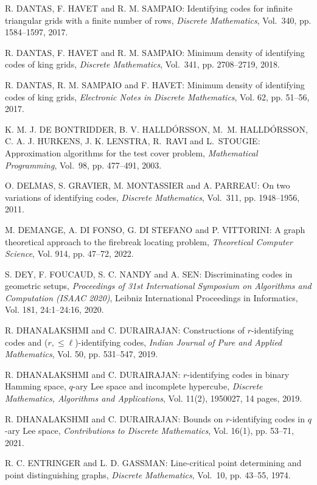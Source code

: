\begin{thebibliography}{999}
R. DANTAS, F. HAVET and R. M. SAMPAIO: Identifying codes for infinite triangular grids with a finite number of rows, {\it Discrete Mathematics}, Vol.~340, pp. 1584--1597, 2017.

R. DANTAS, F. HAVET and R. M. SAMPAIO: Minimum density of identifying codes of king grids, {\it Discrete Mathematics}, Vol.~341, pp. 2708--2719, 2018. 

R. DANTAS, R. M. SAMPAIO and F. HAVET: Minimum density of identifying codes of king grids, {\it Electronic Notes in Discrete Mathematics}, Vol. 62, pp. 51--56, 2017. 

K. M. J. DE BONTRIDDER, B. V. HALLD\'ORSSON, M.~M. HALL\-D\'ORS\-SON, C. A. J. HURKENS, J. K. LENSTRA, R.~RAVI and L.~STOU\-GIE: Approximation algorithms for the test cover problem, {\it Mathematical Programming}, Vol.~98, pp. 477--491, 2003.

O. DELMAS, S. GRAVIER, M. MONTASSIER and A. PARREAU: On two variations of identifying codes, {\it Discrete Mathematics}, Vol.~311, pp. 1948--1956, 2011.

M. DEMANGE, A. DI FONSO, G. DI STEFANO and P. VITTORINI: A graph theoretical approach to the firebreak locating problem, {\it Theoretical Computer Science}, Vol. 914, pp. 47--72, 2022.

S. DEY, F. FOUCAUD, S. C. NANDY and A. SEN: Discriminating codes in geometric setups, {\it Proceedings of 31st International Symposium on Algorithms and Computation (ISAAC 2020)}, Leibniz International Proceedings in Informatics, Vol. 181, 24:1--24:16, 2020.

R. DHANALAKSHMI and C. DURAIRAJAN: Constructions of $r$-identifying codes and ($r,\leq \ell$)-identifying codes, {\it Indian Journal of Pure and Applied Mathematics}, Vol. 50, pp. 531--547, 2019.

R. DHANALAKSHMI and C. DURAIRAJAN: $r$-identifying codes in binary Hamming space, $q$-ary Lee space and incomplete hypercube, {\it Discrete Mathematics, Algorithms and Applications}, Vol. 11(2), 1950027, 14 pages, 2019.

R. DHANALAKSHMI and C. DURAIRAJAN: Bounds on $r$-identifying codes in $q$-ary Lee space, {\it Contributions to Discrete Mathematics}, Vol. 16(1), pp. 53--71, 2021.

R. C. ENTRINGER and L. D. GASSMAN: Line-critical point determining and point distinguishing graphs, {\it Discrete Mathematics}, Vol.~10, pp. 43--55, 1974.


\end{thebibliography}
